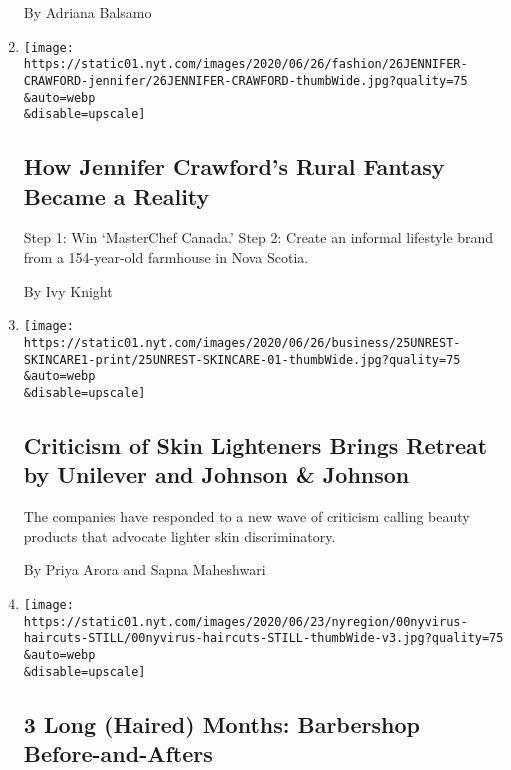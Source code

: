 \begin{enumerate}
  By Adriana Balsamo
\item
  \href{/2020/06/26/style/self-care/how-jennifer-crawfords-rural-fantasy-became-a-reality.html}{}

  \texttt{[image: https://static01.nyt.com/images/2020/06/26/fashion/26JENNIFER-CRAWFORD-jennifer/26JENNIFER-CRAWFORD-thumbWide.jpg?quality=75\\\&auto=webp\\\&disable=upscale]}

  \hypertarget{how-jennifer-crawfords-rural-fantasy-became-a-reality}{%
  \subsection{How Jennifer Crawford's Rural Fantasy Became a
  Reality}\label{how-jennifer-crawfords-rural-fantasy-became-a-reality}}

  Step 1: Win `MasterChef Canada.' Step 2: Create an informal lifestyle
  brand from a 154-year-old farmhouse in Nova Scotia.

  By Ivy Knight
\item
  \href{/2020/06/25/business/unilever-jj-skin-care-lightening.html}{}

  \texttt{[image: https://static01.nyt.com/images/2020/06/26/business/25UNREST-SKINCARE1-print/25UNREST-SKINCARE-01-thumbWide.jpg?quality=75\\\&auto=webp\\\&disable=upscale]}

  \hypertarget{criticism-of-skin-lighteners-brings-retreat-by-unilever-and-johnson--johnson}{%
  \subsection{Criticism of Skin Lighteners Brings Retreat by Unilever
  and Johnson \&
  Johnson}\label{criticism-of-skin-lighteners-brings-retreat-by-unilever-and-johnson--johnson}}

  The companies have responded to a new wave of criticism calling beauty
  products that advocate lighter skin discriminatory.

  By Priya Arora and Sapna Maheshwari
\item
  \href{/2020/06/25/nyregion/nyc-barber-shops-coronavirus.html}{}

  \texttt{[image: https://static01.nyt.com/images/2020/06/23/nyregion/00nyvirus-haircuts-STILL/00nyvirus-haircuts-STILL-thumbWide-v3.jpg?quality=75\\\&auto=webp\\\&disable=upscale]}

  \hypertarget{3-long-haired-months-barbershop-before-and-afters}{%
  \subsection{3 Long (Haired) Months: Barbershop
  Before-and-Afters}\label{3-long-haired-months-barbershop-before-and-afters}}


\end{enumerate}
